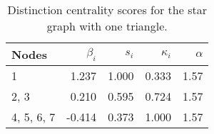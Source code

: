 \begin{table}
\centering
\caption{\label{tab:star1}Distinction centrality scores for the star graph with one triangle.}
\centering
\begin{tabular}[t]{lrrrr}
\toprule
Nodes & $\beta_i$ & $s_i$ & $\kappa_i$ & $\alpha$\\
\midrule
1 & 1.237 & 1.000 & 0.333 & 1.57\\
2, 3 & 0.210 & 0.595 & 0.724 & 1.57\\
4, 5, 6, 7 & -0.414 & 0.373 & 1.000 & 1.57\\
\bottomrule
\end{tabular}
\end{table}
